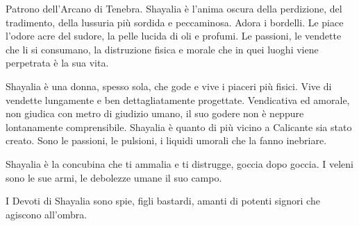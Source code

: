 \begin{multicols}{2}
Patrono dell'Arcano di Tenebra. Shayalia è l'anima oscura della perdizione, del tradimento, della lussuria più sordida e peccaminosa. Adora i bordelli. Le piace l'odore acre del sudore, la pelle lucida di oli e profumi. Le passioni, le vendette che li si consumano, la distruzione fisica e morale che in quei luoghi viene perpetrata è la sua vita.

Shayalia è una donna, spesso sola, che gode e vive i piaceri più fisici. Vive di vendette lungamente e ben dettagliatamente progettate. Vendicativa ed amorale, non giudica con metro di giudizio umano, il suo godere non è neppure lontanamente comprensibile. Shayalia è quanto di più vicino a Calicante sia stato creato. Sono le passioni, le pulsioni, i liquidi umorali che la fanno inebriare.

Shayalia è la concubina che ti ammalia e ti distrugge, goccia dopo goccia. I veleni sono le sue armi, le debolezze umane il suo campo.

I Devoti di Shayalia sono spie, figli bastardi, amanti di potenti signori che agiscono all'ombra.


\end{multicols}
